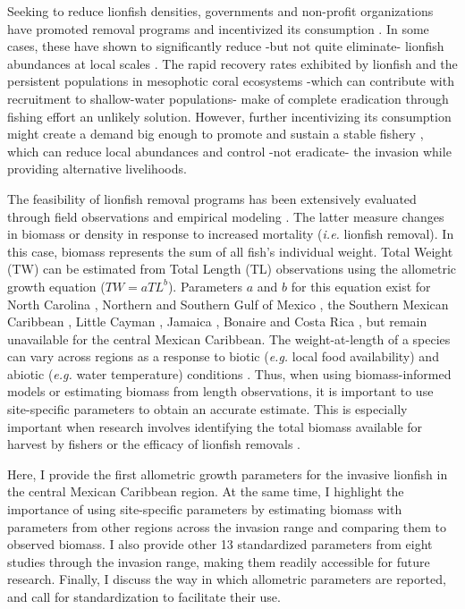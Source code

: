 \documentclass[fleqn,10pt,lineno]{wlpeerj} %
\theoremstyle{definition}
\theoremstyle{definition}
\theoremstyle{definition}
\theoremstyle{remark}
\begin{document}
Seeking to reduce lionfish densities, governments and non-profit
organizations have promoted removal programs and incentivized its
consumption \citep{chin_2016}. In some cases, these have shown to
significantly reduce -but not quite eliminate- lionfish abundances at
local scales \citep{sandel_2015,chin_2016,deleon_2013}. The rapid
recovery rates exhibited by lionfish \citep{barbour_2011} and the
persistent populations in mesophotic coral ecosystems
\citep{andradibrown_2017} -which can contribute with recruitment to
shallow-water populations- make of complete eradication through fishing
effort an unlikely solution. However, further incentivizing its
consumption might create a demand big enough to promote and sustain a
stable fishery \citep{chin_2016}, which can reduce local abundances and
control -not eradicate- the invasion while providing alternative
livelihoods.

The feasibility of lionfish removal programs has been extensively
evaluated through field
observations\citep{usseglio_2017,sandel_2015,chin_2016,deleon_2013} and
empirical modeling \citep{barbour_2011,morris_2011,johnston_2015}. The
latter measure changes in biomass or density
\citep{barbour_2011,johnston_2015} in response to increased mortality
(\emph{i.e.} lionfish removal). In this case, biomass represents the sum
of all fish's individual weight. Total Weight (TW) can be estimated from
Total Length (TL) observations using the allometric growth equation
(\(TW = aTL^b\)). Parameters \(a\) and \(b\) for this equation exist for
North Carolina \citep{barbour_2011}, Northern \citep{fogg_2013} and
Southern Gulf of Mexico \citep{aguilarperera_2016}, the Southern Mexican
Caribbean \citep{sabidoitza_2016}, Little Cayman \citep{edwards_2014},
Jamaica \citep{chin_2016}, Bonaire \citep{deleon_2013} and Costa Rica
\citep{sandel_2015}, but remain unavailable for the central Mexican
Caribbean. The weight-at-length of a species can vary across regions as
a response to biotic (\emph{e.g.} local food availability) and abiotic
(\emph{e.g.} water temperature) conditions \citep{johnson_2016}. Thus,
when using biomass-informed models or estimating biomass from length
observations, it is important to use site-specific parameters to obtain
an accurate estimate. This is especially important when research
involves identifying the total biomass available for harvest by fishers
\citep{chin_2016} or the efficacy of lionfish removals
\citep{barbour_2011,morris_2011,johnston_2015}.

Here, I provide the first allometric growth parameters for the invasive
lionfish in the central Mexican Caribbean region. At the same time, I
highlight the importance of using site-specific parameters by estimating
biomass with parameters from other regions across the invasion range and
comparing them to observed biomass. I also provide other 13 standardized
parameters from eight studies through the invasion range, making them
readily accessible for future research. Finally, I discuss the way in
which allometric parameters are reported, and call for standardization
to facilitate their use.
\end{document}
